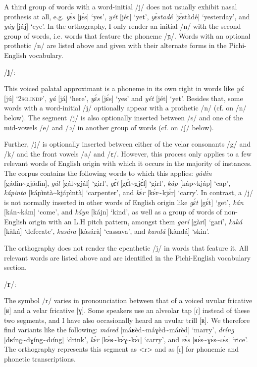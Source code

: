 A third group of words with a word-initial /j/ does not usually exhibit nasal prothesis at all, e.g. \textit{yɛ́s} [jɛ́s] ‘yes’, \textit{yét} [jét] ‘yet’, \textit{yɛ́stadé} [jɛ́stàdé] ‘yesterday’, and \textit{yáy} [jáj] ‘eye’. In the orthography, I only render an initial /n/ with the second group of words, i.e. words that feature the phoneme /ɲ/. Words with an optional prothetic /n/ are listed above and given with their alternate forms in the Pichi-English vocabulary.

\newpage 

/\textbf{j}/:

This voiced palatal approximant is a phoneme in its own right in words like \textit{yú} [jú] \textsc{‘2sg.indp’}, \textit{yá} [já] ‘here’, \textit{yɛ́s} [jɛ́s] ‘yes’ and \textit{yét} [jét] ‘yet’. Besides that, some words with a word-initial /j/ optionally appear with a prothetic /n/ (cf. on /n/ below). The segment /j/ is also optionally inserted between /s/ and one of the mid-vowels /e/ and /ɔ/ in another group of words (cf. on /ʃ/ below). {\fff}


Further, /j/ is optionally inserted between either of the velar consonants /g/ and /k/ and the front vowels /a/ and /ɛ/. However, this process only applies to a few relevant words of English origin with which it occurs in the majority of instances. The corpus contains the following words to which this applies: \textit{gádin} [gádìn{\textasciitilde}gjádìn], \textit{gál} [gál{\textasciitilde}gjál] ‘girl’, \textit{gɛ́l} [gɛ́l{\textasciitilde}gjɛ́l] ‘girl’, \textit{káp} [káp{\textasciitilde}kjáp] ‘cap’, \textit{kápinta} [kápìntà{\textasciitilde}kjápìntà] ‘carpenter’, and \textit{kɛ́r} [kɛ́r{\textasciitilde}kjɛ́r] ‘carry’. In contrast, a /j/ is not normally inserted in other words of English origin like \textit{gɛ́t} [gɛ́t] ‘get’, \textit{kán} [kán{\textasciitilde}kám] ‘come’, and \textit{káyn} [kájn] ‘kind’, as well as a group of words of non-English origin with an L.H pitch pattern, amongst them \textit{garí} [gàrí] ‘garí’, \textit{kaká} [kàká] ‘defecate’, \textit{kasára} [kàsárà] ‘cassava’, and \textit{kandá} [kàndá] ‘skin’. 



The orthography does not render the epenthetic /j/ in words that feature it. All relevant words are listed above and are identified in the Pichi-English vocabulary section. 


/\textbf{r}/:

The symbol /r/ varies in pronounciation between that of a voiced uvular fricative [ʁ] and a velar fricative [ɣ]. Some speakers use an alveolar tap [ɾ] instead of these two segments, and I have also occasionally heard an uvular trill [ʀ]. We therefore find variants like the following: \textit{máred} [máʁèd{\textasciitilde}máɣèd{\textasciitilde}máɾèd] ‘marry’, \textit{dríng} [dʁíng{\textasciitilde}dɣíng{\textasciitilde}dɾíng] ‘drink’, \textit{kɛ́r} [kɛ́ʁ{\textasciitilde}kɛ́ɣ{\textasciitilde}kɛ́ɾ] ‘carry’, and \textit{rɛ́s} [ʁɛ́s{\textasciitilde}ɣɛ́s{\textasciitilde}ɾɛ́s] ‘rice’. The orthography represents this segment as <r> and as [r] for phonemic and phonetic transcriptions.

